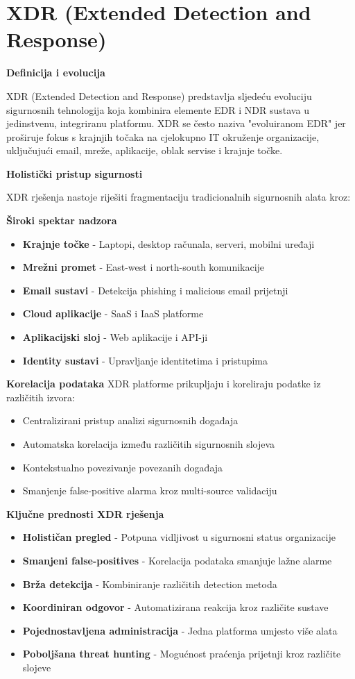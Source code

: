 \chapter{XDR (Extended Detection and Response)}

\textbf{Definicija i evolucija}

XDR (Extended Detection and Response) predstavlja sljedeću evoluciju sigurnosnih tehnologija koja kombinira elemente EDR i NDR sustava u jedinstvenu, integriranu platformu. XDR se često naziva "evoluiranom EDR" jer proširuje fokus s krajnjih točaka na cjelokupno IT okruženje organizacije, uključujući email, mreže, aplikacije, oblak servise i krajnje točke.

\textbf{Holistički pristup sigurnosti}

XDR rješenja nastoje riješiti fragmentaciju tradicionalnih sigurnosnih alata kroz:

\textbf{Široki spektar nadzora}
\begin{itemize}
\item \textbf{Krajnje točke} - Laptopi, desktop računala, serveri, mobilni uređaji
\item \textbf{Mrežni promet} - East-west i north-south komunikacije
\item \textbf{Email sustavi} - Detekcija phishing i malicious email prijetnji
\item \textbf{Cloud aplikacije} - SaaS i IaaS platforme
\item \textbf{Aplikacijski sloj} - Web aplikacije i API-ji
\item \textbf{Identity sustavi} - Upravljanje identitetima i pristupima
\end{itemize}

\textbf{Korelacija podataka}
XDR platforme prikupljaju i koreliraju podatke iz različitih izvora:
\begin{itemize}
\item Centralizirani pristup analizi sigurnosnih događaja
\item Automatska korelacija između različitih sigurnosnih slojeva
\item Kontekstualno povezivanje povezanih događaja
\item Smanjenje false-positive alarma kroz multi-source validaciju
\end{itemize}

\textbf{Ključne prednosti XDR rješenja}

\begin{itemize}
\item \textbf{Holističan pregled} - Potpuna vidljivost u sigurnosni status organizacije
\item \textbf{Smanjeni false-positives} - Korelacija podataka smanjuje lažne alarme
\item \textbf{Brža detekcija} - Kombiniranje različitih detection metoda
\item \textbf{Koordiniran odgovor} - Automatizirana reakcija kroz različite sustave
\item \textbf{Pojednostavljena administracija} - Jedna platforma umjesto više alata
\item \textbf{Poboljšana threat hunting} - Mogućnost praćenja prijetnji kroz različite slojeve
\end{itemize}

